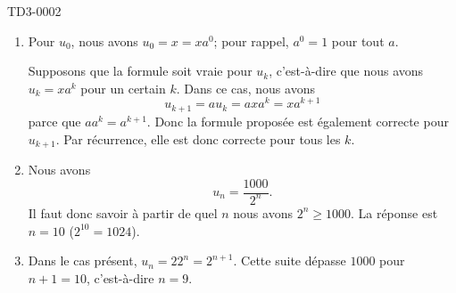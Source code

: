 
\begin{corrige}{TD3-0002}

	\begin{enumerate}
		\item
			Pour $u_0$, nous avons $u_0=x=xa^0$; pour rappel, $a^0=1$ pour tout $a$.

			Supposons que la formule soit vraie pour $u_k$, c'est-à-dire que nous avons $u_k=xa^k$ pour un certain $k$. Dans ce cas, nous avons
			\begin{equation}
				u_{k+1}=au_{k}=axa^k=xa^{k+1}
			\end{equation}
			parce que $aa^k=a^{k+1}$. Donc la formule proposée est également correcte pour $u_{k+1}$. Par récurrence, elle est donc correcte pour tous les $k$.
		\item
			Nous avons
			\begin{equation}
				u_n=\frac{ 1000 }{ 2^n }.
			\end{equation}
			Il faut donc savoir à partir de quel $n$ nous avons $2^n\geq 1000$. La réponse est $n=10$ ($2^{10}=1024$).
		\item
			Dans le cas présent, $u_n=22^n=2^{n+1}$. Cette suite dépasse $1000$ pour $n+1=10$, c'est-à-dire $n=9$.
	\end{enumerate}

\end{corrige}
